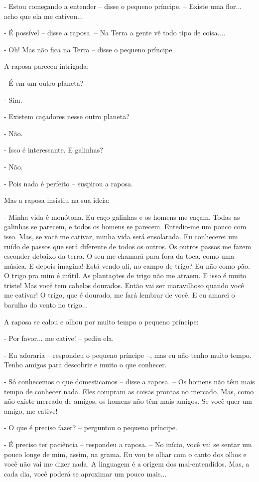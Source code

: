 - Estou começando a entender -- disse o pequeno príncipe. -- Existe uma
flor... acho que ela me cativou...

- É possível -- disse a raposa. -- Na Terra a gente vê todo tipo de
coisa....

- Oh! Mas não fica na Terra -- disse o pequeno príncipe.

A raposa pareceu intrigada:

- É em um outro planeta?

- Sim.

- Existem caçadores nesse outro planeta?

- Não.

- Isso é interessante. E galinhas?

- Não.

- Pois nada é perfeito -- suspirou a raposa.

Mas a raposa insistiu na sua ideia:

- Minha vida é monótona. Eu caço galinhas e os homens me caçam. Todas as
galinhas se parecem, e todos os homens se parecem. Entedio-me um pouco
com isso. Mas, se você me cativar, minha vida será ensolarada. Eu
conhecerei um ruído de passos que será diferente de todos os outros. Os
outros passos me fazem esconder debaixo da terra. O seu me chamará para
fora da toca, como uma música. E depois imagina! Está vendo ali, no
campo de trigo? Eu não como pão. O trigo pra mim é inútil. As plantações
de trigo não me atraem. E isso é muito triste! Mas você tem cabelos
dourados. Então vai ser maravilhoso quando você me cativar! O trigo, que
é dourado, me fará lembrar de você. E eu amarei o barulho do vento no
trigo...

A raposa se calou e olhou por muito tempo o pequeno príncipe:

- Por favor... me cative! -- pediu ela.

- Eu adoraria -- respondeu o pequeno príncipe --, mas eu não tenho muito
tempo. Tenho amigos para descobrir e muito o que conhecer.

- Só conhecemos o que domesticamos -- disse a raposa. -- Os homens não
têm mais tempo de conhecer nada. Eles compram as coisas prontas no
mercado. Mas, como não existe mercado de amigos, os homens não têm mais
amigos. Se você quer um amigo, me cative!

- O que é preciso fazer? -- perguntou o pequeno príncipe.

- É preciso ter paciência -- respondeu a raposa. -- No início, você vai
se sentar um pouco longe de mim, assim, na grama. Eu vou te olhar com o
canto dos olhos e você não vai me dizer nada. A linguagem é a origem dos
mal-entendidos. Mas, a cada dia, você poderá se aproximar um pouco
mais...

